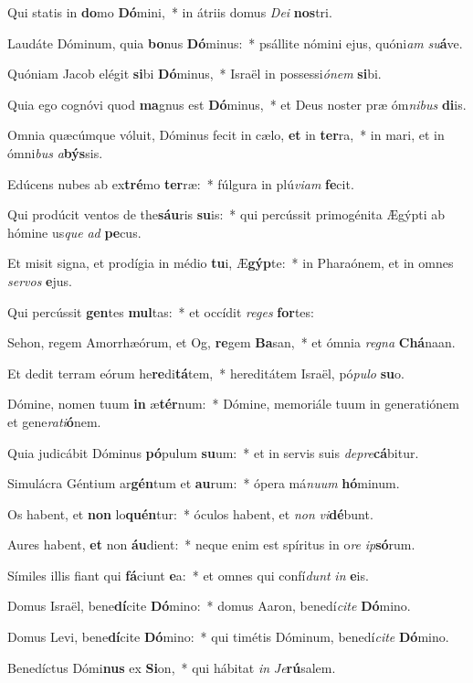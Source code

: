 \item Qui statis in \textbf{do}mo \textbf{Dó}mini,~* in átriis domus \textit{De}\textit{i} \textbf{nos}tri.
\item Laudáte Dóminum, quia \textbf{bo}nus \textbf{Dó}minus:~* psállite nómini ejus, quóni\textit{am} \textit{su}\textbf{á}ve.
\item Quóniam Jacob elégit \textbf{si}bi \textbf{Dó}minus,~* Israël in possessi\textit{ó}\textit{nem} \textbf{si}bi.
\item Quia ego cognóvi quod \textbf{ma}gnus est \textbf{Dó}minus,~* et Deus noster præ óm\textit{ni}\textit{bus} \textbf{di}is.
\item Omnia quæcúmque vóluit, Dóminus fecit in cælo, \textbf{et} in \textbf{ter}ra,~* in mari, et in ómni\textit{bus} \textit{a}\textbf{býs}sis.
\item Edúcens nubes ab ex\textbf{tré}mo \textbf{ter}ræ:~* fúlgura in plú\textit{vi}\textit{am} \textbf{fe}cit.
\item Qui prodúcit ventos de the\textbf{sáu}ris \textbf{su}is:~* qui percússit primogénita Ægýpti ab hómine us\textit{que} \textit{ad} \textbf{pe}cus.
\item Et misit signa, et prodígia in médio \textbf{tu}i, Æ\textbf{gýp}te:~* in Pharaónem, et in omnes \textit{ser}\textit{vos} \textbf{e}jus.
\item Qui percússit \textbf{gen}tes \textbf{mul}tas:~* et occídit \textit{re}\textit{ges} \textbf{for}tes:
\item Sehon, regem Amorrhæórum, et Og, \textbf{re}gem \textbf{Ba}san,~* et ómnia \textit{re}\textit{gna} \textbf{Chá}naan.
\item Et dedit terram eórum he\textbf{re}di\textbf{tá}tem,~* hereditátem Israël, pó\textit{pu}\textit{lo} \textbf{su}o.
\item Dómine, nomen tuum \textbf{in} æ\textbf{tér}num:~* Dómine, memoriále tuum in generatiónem et gene\textit{ra}\textit{ti}\textbf{ó}nem.
\item Quia judicábit Dóminus \textbf{pó}pulum \textbf{su}um:~* et in servis suis \textit{de}\textit{pre}\textbf{cá}bitur.
\item Simulácra Géntium ar\textbf{gén}tum et \textbf{au}rum:~* ópera má\textit{nu}\textit{um} \textbf{hó}minum.
\item Os habent, et \textbf{non} lo\textbf{quén}tur:~* óculos habent, et \textit{non} \textit{vi}\textbf{dé}bunt.
\item Aures habent, \textbf{et} non \textbf{áu}dient:~* neque enim est spíritus in o\textit{re} \textit{ip}\textbf{só}rum.
\item Símiles illis fiant qui \textbf{fá}ciunt \textbf{e}a:~* et omnes qui confí\textit{dunt} \textit{in} \textbf{e}is.
\item Domus Israël, bene\textbf{dí}cite \textbf{Dó}mino:~* domus Aaron, benedí\textit{ci}\textit{te} \textbf{Dó}mino.
\item Domus Levi, bene\textbf{dí}cite \textbf{Dó}mino:~* qui timétis Dóminum, benedí\textit{ci}\textit{te} \textbf{Dó}mino.
\item Benedíctus Dómi\textbf{nus} ex \textbf{Si}on,~* qui hábitat \textit{in} \textit{Je}\textbf{rú}salem.

